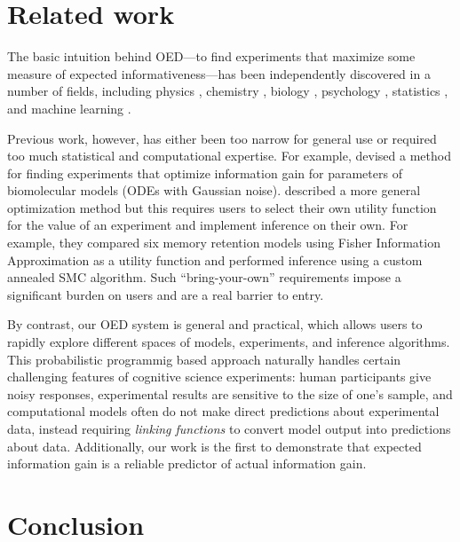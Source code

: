\documentclass[10pt,letterpaper]{article}
\begin{document}

\section{Related work}

The basic intuition behind OED---to find experiments that maximize some measure of expected informativeness---has been independently discovered in a number of fields, including physics \citep{vanDenBerg2003}, chemistry \citep{Huan2010}, biology \citep{Vanlier2012, Liepe2013}, psychology \citep{Myung2009}, statistics \citep{Lindley1956}, and machine learning \citep{Golovin2010}.

Previous work, however, has either been too narrow for general use or required too much statistical and computational expertise.
For example, \cite{Liepe2013} devised a method for finding experiments that optimize information gain for parameters of biomolecular models (ODEs with Gaussian noise).
\cite{Myung2009} described a more general optimization method but this requires users to select their own utility function for the value of an experiment and implement inference on their own.
For example, they compared six memory retention models using Fisher Information Approximation as a utility function and performed inference using a custom annealed SMC algorithm.
Such ``bring-your-own'' requirements impose a significant burden on users and are a real barrier to entry.

By contrast, our OED system is general and practical, which allows users to rapidly explore different spaces of models, experiments, and inference algorithms.
This probabilistic programmig based approach naturally handles certain challenging features of cognitive science experiments: human participants give noisy responses, experimental results are sensitive to the size of one's sample, and computational models often do not make direct predictions about experimental data, instead requiring \emph{linking functions} to convert model output into predictions about data.
Additionally, our work is the first to demonstrate that expected information gain is a reliable predictor of actual information gain.

\section{Conclusion}
\end{document}
